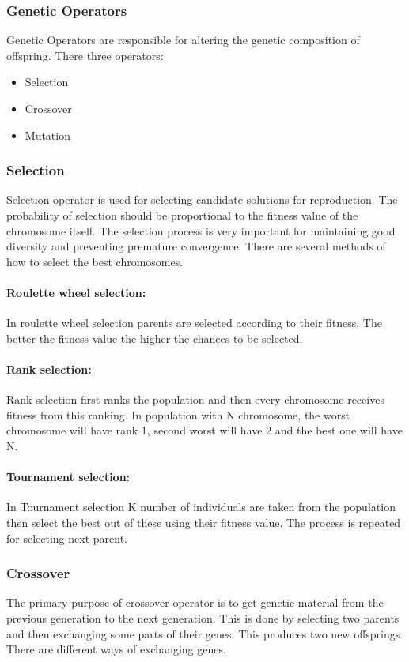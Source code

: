 \subsubsection{Genetic Operators}
Genetic Operators are responsible for altering the genetic composition of offspring. There three operators:
\begin{itemize}
	\item Selection
	\item Crossover
	\item Mutation
\end{itemize}

\subsubsection{Selection}
Selection operator is used for selecting candidate solutions for reproduction. The probability of selection should be proportional to the fitness value of the chromosome itself. The selection process is very important for maintaining good diversity and preventing premature convergence. There are several methods of how to select the best chromosomes. 

\paragraph{Roulette wheel selection:} In roulette wheel selection parents are selected according to their fitness. The better the fitness value the higher the chances to be selected.
\paragraph{Rank selection:} Rank selection first ranks the population and then every chromosome receives fitness from this ranking. In population with N chromosome, the worst chromosome will have rank 1, second worst  will have 2 and the best one will have N.
\paragraph{Tournament selection:} In Tournament selection K number of individuals are taken from the population then select the best out of these using their fitness value. The process is repeated for selecting next parent.
\citep{tutp.com:98ga}

\subsubsection{Crossover}
The primary purpose of crossover operator is to get genetic material from the previous generation to the next generation. This is done by selecting two parents and then exchanging some parts of their genes. This produces two new offsprings. There are different ways of exchanging genes.
